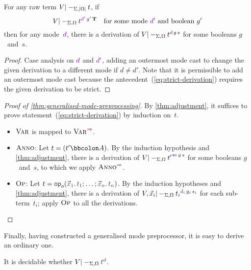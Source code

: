 \begin{lemma}\label{thm:adjustment}
For any raw term $V |-_{\Sigma,\left|\Omega\right|} t$, if
\begin{equation}\label{eq:strict-derivation}
V |-_{\Sigma,\Omega} t^{\dir{d'}\,g'\,\BTrue} \quad\text{for some mode~$\dir{d'}$ and boolean~$g'$}
\end{equation}
then for any mode~$\dir{d}$, there is a derivation of\/ $V |-_{\Sigma,\Omega} t^{\dir{d}\,g\,s}$ for some booleans $g$~and~$s$.
\end{lemma}

\begin{proof}
Case analysis on $\dir{d}$ and $\dir{d'}$, adding an outermost mode cast to change the given derivation to a different mode if $d \neq d'$.
Note that it is permissible to add an outermost mode cast because the antecedent~(\ref{eq:strict-derivation}) requires the given derivation to be strict.
\end{proof}



\begin{proof}[Proof of \cref{thm:generalised-mode-preprocessing}]
By \cref{thm:adjustment}, it suffices to prove statement~(\ref{eq:strict-derivation}) by induction on~$t$.

\begin{itemize}
\item $\textnormal{\textsc{Var}}$ is mapped to $\SynRule{Var}$.
\item $\textnormal{\textsc{Anno}}$:
Let $t = (t' \bbcolon A)$.
By the induction hypothesis and \cref{thm:adjustment}, there is a derivation of $V |-_{\Sigma,\Omega} {t'}^{\chk\,g\,s}$ for some booleans $g$~and~$s$, to which we apply $\SynRule{Anno}$.
\item $\textnormal{\textsc{Op}}$:
Let $t = \tmOpts$.
By the induction hypotheses and \cref{thm:adjustment}, there is a derivation of $V, \vec x_i |-_{\Sigma,\Omega} {t_i}^{\dir{d_i}\,g_i\,s_i}$ for each sub-term~$t_i$; apply $\textnormal{\textsc{Op}}$ to all the derivations.
\vspace{-\topsep-\baselineskip}
\end{itemize}
\end{proof}

Finally, having constructed a generalised mode preprocessor, it is easy to derive an ordinary one.

\begin{corollary}\label{thm:mode-preprocessing}
  It is decidable whether $V |-_{\Sigma,\Omega} \isTerm{t}^\dir{d}$.%
\end{corollary}

